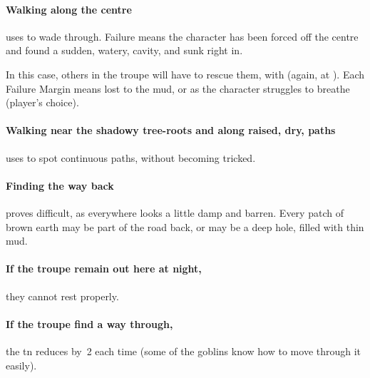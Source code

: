 \paragraph{Walking along the centre}
uses  to wade through.
Failure means the character has been forced off the centre and found a sudden, watery, cavity, and sunk right in.

In this case, others in the troupe will have to rescue them, with  (again, at \tn[10]).
Each Failure Margin means  lost to the mud, or  as the character struggles to breathe (player's choice).

\paragraph{Walking near the shadowy tree-roots and along raised, dry, paths}
uses  to spot continuous paths, without becoming tricked.

\paragraph{Finding the way back}
proves difficult, as everywhere looks a little damp and barren.
Every patch of brown earth may be part of the road back, or may be a deep hole, filled with thin mud.

\paragraph{If the troupe remain out here at night,}
they cannot rest properly.

\paragraph{If the troupe find a way through,}
the \gls{tn} reduces by~2 each time (some of the goblins know how to move through it easily).

\stopcontents[segments]


